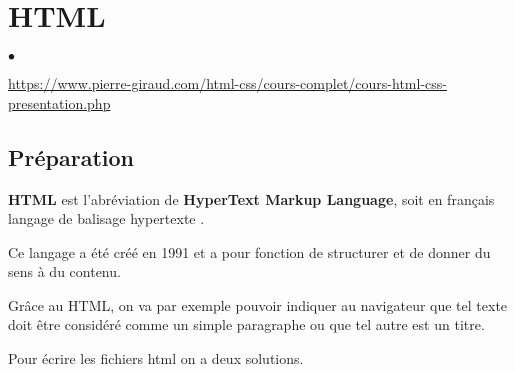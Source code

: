 \documentclass[10pt,dvipsnames, dvips, svgnames]{article}
\begin{document}
\section{HTML}

\begin{list}{$\bullet$}{}
\item \url{https://www.pierre-giraud.com/html-css/cours-complet/cours-html-css-presentation.php}
\end{list}

\subsection{Préparation}



\textbf{HTML} est l'abréviation de \textbf{HyperText Markup Language}, soit en français \og  langage de balisage hypertexte \fg.

Ce langage a été créé en 1991 et a pour fonction de structurer et de donner du sens à du contenu.

Grâce au HTML, on va par exemple pouvoir indiquer au navigateur que tel texte doit être considéré comme un simple paragraphe ou que tel autre est un titre.

Pour écrire les fichiers html on a deux solutions.
\end{document}
